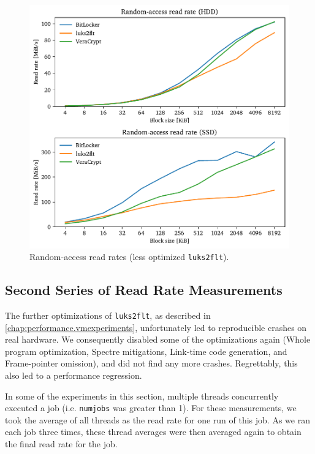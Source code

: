 \begin{figure}[htb!]
	\center
	\includegraphics[scale=1]{../fig/performance.hwexperiments.beforeoptrand.pdf}
	\caption[
		Random-access read rates (less optimized \texttt{luks2flt})
	]{
		Random-access read rates (less optimized \texttt{luks2flt}). 
	}
	\label{fig:performance.hwexperiments.beforeoptrand}
\end{figure}

\subsection{Second Series of Read Rate Measurements}
\label{chap:performance.hwexperiments.encryptedseries2}
The further optimizations of \texttt{luks2flt}, as described in \autoref{chap:performance.vmexperiments}, unfortunately led to reproducible crashes on real hardware.  We consequently disabled some of the optimizations again (Whole program optimization, Spectre mitigations, Link-time code generation, and Frame-pointer omission), and did not find any more crashes. Regrettably, this also led to a performance regression. 

In some of the experiments in this section, multiple threads concurrently executed a job (i.e. \texttt{numjobs} was greater than 1). For these measurements, we took the average of all threads as the read rate for one run of this job. As we ran each job three times, these thread averages were then averaged again to obtain the final read rate for the job.

